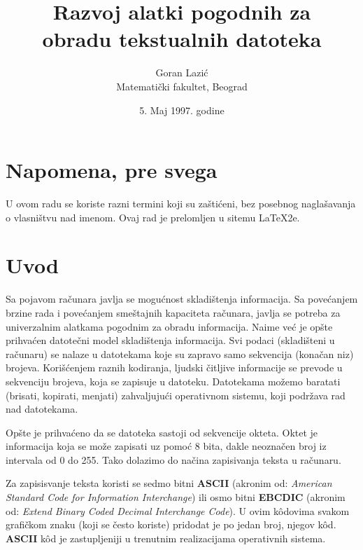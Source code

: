 \documentclass[12pt,a4paper]{article}
\title{\bf Razvoj alatki pogodnih za\\obradu tekstualnih datoteka}
\author{Goran Lazi\'c\\Matemati\v cki fakultet, Beograd}
\date{5. Maj 1997. godine}
\begin{document}
  \maketitle
  \tableofcontents
%
%
  \section*{Napomena, pre svega}
    U ovom radu se koriste razni termini koji su za\v sti\'ceni, bez posebnog
    nagla\-\v savanja o vlasni\v stvu nad imenom.
    Ovaj rad je prelomljen u sitemu \LaTeX2e.
%
%
  \newpage
  \section{Uvod}
    Sa pojavom ra\v cunara javlja se mogu\'cnost skladi\v stenja informacija.
    Sa pove\-\'canjem brzine rada i pove\'canjem sme\v stajnih kapaciteta
    ra\v cunara, javlja se potreba za univerzalnim alatkama pogodnim za obradu
    informacija.
    Naime ve\'c je op\v ste prihva\'cen datote\v cni model skladi\v stenja
    informacija.
    Svi podaci (skladi\v steni u ra\v cunaru) se nalaze u datotekama koje su
    zapravo samo sekvencija (kona\v can niz) brojeva.
    Kori\v s\'cenjem raznih kodiranja, ljudski \v citljive informacije se
    prevode u sekvenciju brojeva, koja se zapisuje u datoteku.
    Datotekama mo\v zemo baratati (brisati, kopirati, menjati) zahvaljuju\'ci
    operativnom sistemu, koji podr\v zava rad nad datotekama.

    Op\v ste je prihva\'ceno da se datoteka sastoji od sekvencije okteta.
    Oktet je informacija koja se mo\v ze zapisati uz pomo\'c 8 bita, dakle
    neozna\v cen broj iz intervala od 0 do 255.
    Tako dolazimo do na\v cina zapisivanja teksta u ra\v cunaru.

    Za zapisisvanje teksta koristi se sedmo bitni {\bf ASCII} (akronim od:
    {\em American Standard Code for Information Interchange}) ili osmo bitni
    {\bf EBCDIC} (akronim od: {\em Extend Binary Coded Decimal Interchange
    Code}).
    U ovim k\^odovima svakom grafi\v ckom znaku (koji se \v cesto koriste)
    pridodat je po jedan broj, njegov k\^od.
    {\bf ASCII} k\^od je zastupljeniji u trenutnim realizacijama opera\-tivnih
    sistema.
\end{document}
